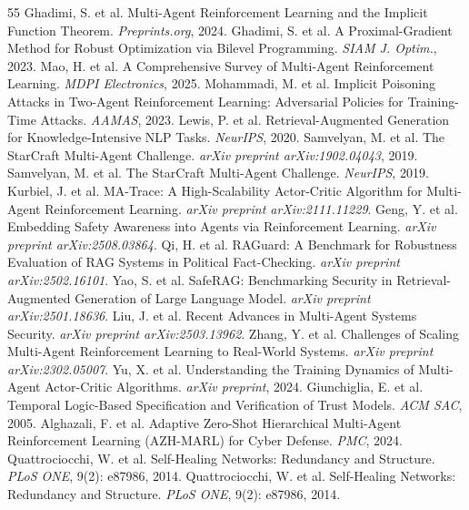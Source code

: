 \documentclass[conference]{IEEEtran}
\begin{document}
\begin{thebibliography}{55}
 Ghadimi, S. et al. Multi-Agent Reinforcement Learning and the Implicit Function Theorem. \emph{Preprints.org}, 2024.
 Ghadimi, S. et al. A Proximal-Gradient Method for Robust Optimization via Bilevel Programming. \emph{SIAM J. Optim.}, 2023.
 Mao, H. et al. A Comprehensive Survey of Multi-Agent Reinforcement Learning. \emph{MDPI Electronics}, 2025.
 Mohammadi, M. et al. Implicit Poisoning Attacks in Two-Agent Reinforcement Learning: Adversarial Policies for Training-Time Attacks. \emph{AAMAS}, 2023.
 Lewis, P. et al. Retrieval-Augmented Generation for Knowledge-Intensive NLP Tasks. \emph{NeurIPS}, 2020.
 Samvelyan, M. et al. The StarCraft Multi-Agent Challenge. \emph{arXiv preprint arXiv:1902.04043}, 2019.
 Samvelyan, M. et al. The StarCraft Multi-Agent Challenge. \emph{NeurIPS}, 2019.
 Kurbiel, J. et al. MA-Trace: A High-Scalability Actor-Critic Algorithm for Multi-Agent Reinforcement Learning. \emph{arXiv preprint arXiv:2111.11229}.
 Geng, Y. et al. Embedding Safety Awareness into Agents via Reinforcement Learning. \emph{arXiv preprint arXiv:2508.03864}.
 Qi, H. et al. RAGuard: A Benchmark for Robustness Evaluation of RAG Systems in Political Fact-Checking. \emph{arXiv preprint arXiv:2502.16101}.
 Yao, S. et al. SafeRAG: Benchmarking Security in Retrieval-Augmented Generation of Large Language Model. \emph{arXiv preprint arXiv:2501.18636}.
 Liu, J. et al. Recent Advances in Multi-Agent Systems Security. \emph{arXiv preprint arXiv:2503.13962}.
 Zhang, Y. et al. Challenges of Scaling Multi-Agent Reinforcement Learning to Real-World Systems. \emph{arXiv preprint arXiv:2302.05007}.
 Yu, X. et al. Understanding the Training Dynamics of Multi-Agent Actor-Critic Algorithms. \emph{arXiv preprint}, 2024.
 Giunchiglia, E. et al. Temporal Logic-Based Specification and Verification of Trust Models. \emph{ACM SAC}, 2005.
 Alghazali, F. et al. Adaptive Zero-Shot Hierarchical Multi-Agent Reinforcement Learning (AZH-MARL) for Cyber Defense. \emph{PMC}, 2024.
 Quattrociocchi, W. et al. Self-Healing Networks: Redundancy and Structure. \emph{PLoS ONE}, 9(2): e87986, 2014.
 Quattrociocchi, W. et al. Self-Healing Networks: Redundancy and Structure. \emph{PLoS ONE}, 9(2): e87986, 2014.

\end{thebibliography}
\end{document}
